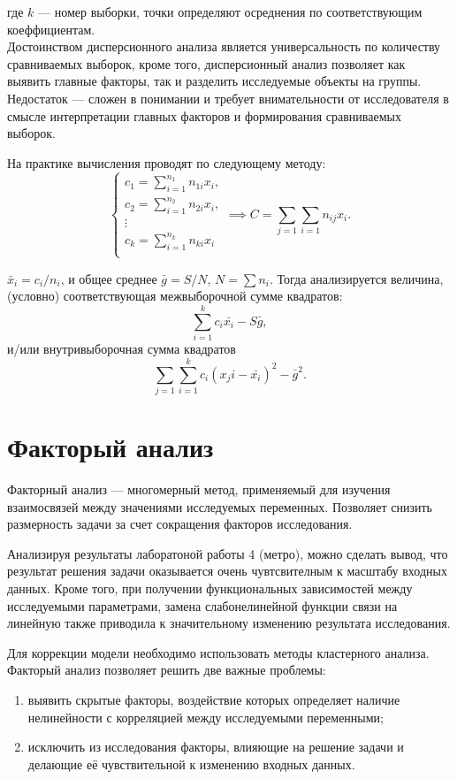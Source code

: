 \documentclass[12pt]{article}
\begin{document}
где $k$ --- номер выборки, точки определяют осреднения по соответствующим коеффициентам.\\

Достоинством дисперсионного анализа является универсальность по количеству сравниваемых выборок, кроме того, дисперсионный анализ позволяет как выявить главные факторы, так и разделить исследуемые объекты на группы. Недостаток --- сложен в понимании и требует внимательности от исследователя в смысле интерпретации главных факторов и формирования сравниваемых выборок.

На практике вычисления проводят по следующему методу:
\[
\begin{cases}
    c_1 = \sum_{i=1}^{n_1} n_{1i} x_i,\\
    c_2 = \sum_{i=1}^{n_2} n_{2i} x_i,\\
    \vdots\\
    c_k = \sum_{i=1}^{n_k} n_{ki} x_i\\ 
\end{cases}
\implies C = \sum_{j=1}\sum_{i=1}n_{ij} x_i.
\]

$\bar{x}_i = c_i / n_i$, и общее среднее $\bar{g} = S / N$, $N = \sum n_i$. Тогда анализируется величина, (условно) соответствующая межвыборочной сумме квадратов:
\[ \sum_{i=1}^k c_i \bar{x_i} - S\bar{g}, \]
и/или внутривыборочная сумма квадратов
\[ \sum_{j=1}\sum_{i=1}^k c_i (x_ji - \bar{x_i})^2 - \bar{g}^2. \] 

\newpage
\section{Факторый анализ}
Факторный анализ --- многомерный метод, применяемый для изучения взаимосвязей между значениями исследуемых переменных. Позволяет снизить размерность задачи за счет сокращения факторов исследования.

Анализируя результаты лаборатоной работы 4 (метро), можно сделать вывод, что результат решения задачи оказывается очень чувтсвителным к масштабу входных данных. Кроме того, при получении функциональных зависимостей между исследуемыми параметрами, замена слабонелинейной функции связи на линейную также приводила к значительному изменению результата исследования.

Для коррекции модели необходимо использовать методы кластерного анализа. Факторый анализ позволяет решить две важные проблемы:
\begin{enumerate}
    \item выявить скрытые факторы, воздействие которых определяет наличие нелинейности с корреляцией между исследуемыми переменными;
    \item исключить из исследования факторы, влияющие на решение задачи и делающие её чувствительной к изменению входных данных. 
\end{enumerate} 
\end{document}
